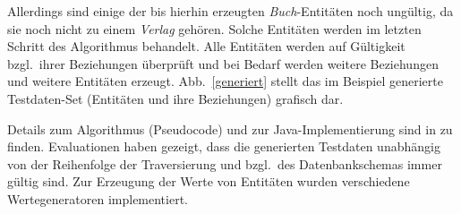 %
%
Allerdings sind einige der bis hierhin erzeugten \textit{Buch}-Entitäten noch ungültig, da sie noch nicht zu einem \textit{Verlag} gehören.
%
Solche Entitäten werden im letzten Schritt des Algorithmus behandelt. Alle Entitäten werden auf Gültigkeit bzgl.~ihrer Beziehungen überprüft und bei Bedarf werden weitere Beziehungen und weitere Entitäten erzeugt.
%
Abb.~\ref{generiert} stellt das im Beispiel generierte Testdaten-Set (Entitäten und ihre Beziehungen) grafisch dar. 
%
%
	
		
Details zum Algorithmus (Pseudocode) und zur Java-Implementierung sind in \cite{MT:Moll:2013} zu finden.
%
Evaluationen haben gezeigt, dass die generierten Testdaten unabhängig von der Reihenfolge der Traversierung und  bzgl.~des Datenbankschemas immer gültig sind.
%
Zur Erzeugung der Werte von Entitäten wurden verschiedene Wertegeneratoren implementiert.	

	
	

